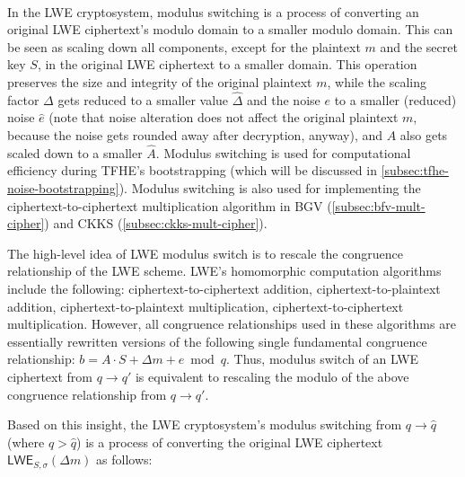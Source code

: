 $ $


In the LWE cryptosystem, modulus switching is a process of converting an original LWE ciphertext's modulo domain to a smaller modulo domain. This can be seen as scaling down all components, except for the plaintext $m$ and the secret key $S$, in the original LWE ciphertext to a smaller domain. This operation preserves the size and integrity of the original plaintext $m$, while the scaling factor $\Delta$ gets reduced to a smaller value $\hat{\Delta}$ and the noise $e$ to a smaller (reduced) noise $\hat{e}$ (note that noise alteration does not affect the original plaintext $m$, because the noise gets rounded away after decryption, anyway), and $A$ also gets scaled down to a smaller $\hat A$. Modulus switching is used for computational efficiency during TFHE's bootstrapping (which will be discussed in \autoref{subsec:tfhe-noise-bootstrapping}). Modulus switching is also used for implementing the ciphertext-to-ciphertext multiplication algorithm in BGV (\autoref{subsec:bfv-mult-cipher}) and CKKS (\autoref{subsec:ckks-mult-cipher}). 

The high-level idea of LWE modulus switch is to rescale the congruence relationship of the LWE scheme. LWE's homomorphic computation algorithms include the following: ciphertext-to-ciphertext addition, ciphertext-to-plaintext addition, ciphertext-to-plaintext multiplication, ciphertext-to-ciphertext multiplication. However, all congruence relationships used in these algorithms are essentially rewritten versions of the following single fundamental congruence relationship: $b = A\cdot S + \Delta m + e \bmod q$. Thus, modulus switch of an LWE ciphertext from $q \rightarrow q'$ is equivalent to rescaling the modulo of the above congruence relationship from $q \rightarrow q'$.

Based on this insight, the LWE cryptosystem's modulus switching from $q \rightarrow \hat{q}$ (where $q > \hat{q}$) is a process of converting the original LWE ciphertext $\textsf{LWE}_{S, \sigma}(\Delta m)$ as follows:

